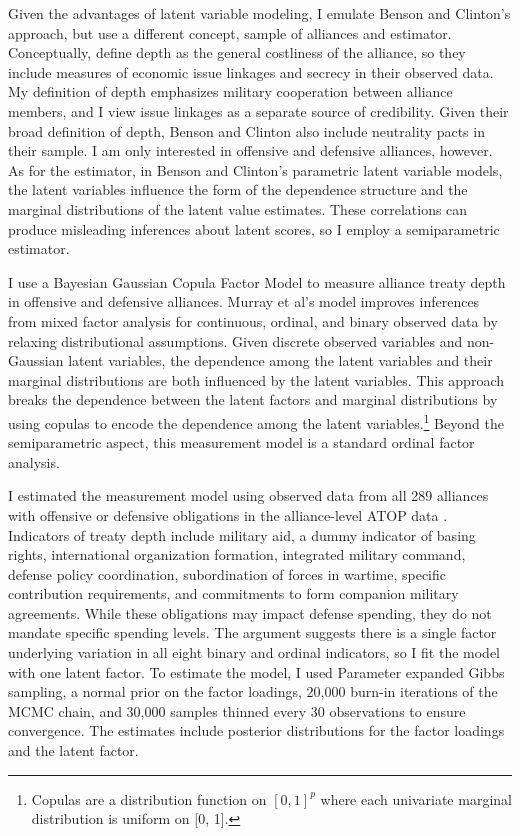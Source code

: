 \documentclass[12pt]{article}
\begin{document}
Given the advantages of latent variable modeling, I emulate Benson and Clinton's approach, but use a different concept, sample of alliances and estimator. 
Conceptually, \citet{BensonClinton2016} define depth as the general costliness of the alliance, so they include measures of economic issue linkages and secrecy in their observed data.
My definition of depth emphasizes military cooperation between alliance members, and I view issue linkages as a separate source of credibility. 
Given their broad definition of depth, Benson and Clinton also include neutrality pacts in their sample.
I am only interested in offensive and defensive alliances, however.  
As for the estimator, in Benson and Clinton's parametric latent variable models, the latent variables influence the form of the dependence structure and the marginal distributions of the latent value estimates. 
These correlations can produce misleading inferences about latent scores, so I employ a semiparametric estimator.
 

I use a Bayesian Gaussian Copula Factor Model \citep{Murrayetal2013} to measure alliance treaty depth in offensive and defensive alliances. 
Murray et al's model improves inferences from mixed factor analysis for continuous, ordinal, and binary observed data by relaxing distributional assumptions.
Given discrete observed variables and non-Gaussian latent variables, the dependence among the latent variables and their marginal distributions are both influenced by the latent variables.
This approach breaks the dependence between the latent factors and marginal distributions by using copulas to encode the dependence among the latent variables.\footnote{Copulas are a distribution function on $[0, 1]^p$ where each univariate marginal distribution is uniform on [0, 1].}
Beyond the semiparametric aspect, this measurement model is a standard ordinal factor analysis.


I estimated the measurement model using observed data from all 289 alliances with offensive or defensive obligations in the alliance-level ATOP data \citep{Leedsetal2002}. 
Indicators of treaty depth include military aid, a dummy indicator of basing rights, international organization formation, integrated military command, defense policy coordination, subordination of forces in wartime, specific contribution requirements, and commitments to form companion military agreements.
While these obligations may impact defense spending, they do not mandate specific spending levels. 
The argument suggests there is a single factor underlying variation in all eight binary and ordinal indicators, so I fit the model with one latent factor. 
To estimate the model, I used Parameter expanded Gibbs sampling, a normal prior on the factor loadings, 20,000 burn-in iterations of the MCMC chain, and 30,000 samples thinned every 30 observations to ensure convergence. 
The estimates include posterior distributions for the factor loadings and the latent factor. 
\end{document}
